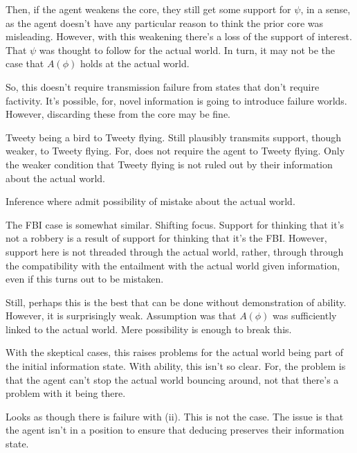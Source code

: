 \documentclass[10pt]{article}
\begin{document}
\begin{note}
  Then, if the agent weakens the core, they still get some support for \(\psi\), in a sense, as the agent doesn't have any particular reason to think the prior core was misleading.
  However, with this weakening there's a loss of the support of interest.
  That \(\psi\) was thought to follow for the actual world.
  In turn, it may not be the case that \(A(\phi)\) holds at the actual world.

  So, this doesn't require transmission failure from states that don't require factivity.
  It's possible, for, novel information is going to introduce failure worlds.
  However, discarding these from the core may be fine.

  Tweety being a bird to Tweety flying.
  Still plausibly transmits support, though weaker, to Tweety flying.
  For, does not require the agent to Tweety flying.
  Only the weaker condition that Tweety flying is not ruled out by their information about the actual world.

  Inference where admit possibility of mistake about the actual world.

  The FBI case is somewhat similar.
  Shifting focus.
  Support for thinking that it's not a robbery is a result of support for thinking that it's the FBI.
  However, support here is not threaded through the actual world, rather, through through the compatibility with the entailment with the actual world given information, even if this turns out to be mistaken.

    {
    \color{red}
    Still, perhaps this is the best that can be done without demonstration of ability.
    However, it is surprisingly weak.
    Assumption was that \(A(\phi)\) was sufficiently linked to the actual world.
    Mere possibility is enough to break this.
  }
\end{note}

\begin{note}
  With the skeptical cases, this raises problems for the actual world being part of the initial information state.
  With ability, this isn't so clear.
  For, the problem is that the agent can't stop the actual world bouncing around, not that there's a problem with it being there.
\end{note}



\begin{note}
  Looks as though there is failure with (ii).
  This is not the case.
  The issue is that the agent isn't in a position to ensure that deducing preserves their information state.
\end{note}
\end{document}
